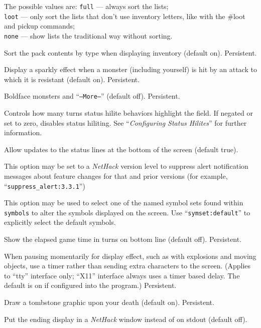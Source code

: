 The possible values are:
{\tt full} --- always sort the lists;\\
{\tt loot} --- only sort the lists that don't use inventory
       letters, like with the \#loot and pickup commands;\\
{\tt none} --- show lists the traditional way without sorting.
\item[\ib{sortpack}]
Sort the pack contents by type when displaying inventory (default on).
Persistent.
\item[\ib{sparkle}]
Display a sparkly effect when a monster (including yourself) is hit by an
attack to which it is resistant (default on).  Persistent.
\item[\ib{standout}]
Boldface monsters and ``{\tt --More--}'' (default off).  Persistent.
\item[\ib{statushilites}]
Controls how many turns status hilite behaviors highlight
the field. If negated or set to zero, disables status hiliting.
See ``{\it Configuring Status Hilites\/}'' for further information.
\item[\ib{status\verb+_+updates}]
Allow updates to the status lines at the bottom of the screen (default true).
\item[\ib{suppress\verb+_+alert}]
This option may be set to a {\it NetHack\/} version level to suppress
alert notification messages about feature changes for that
and prior versions (for example, ``{\tt suppress\verb+_+alert:3.3.1}'')
\item[\ib{symset}]
This option may be used to select one of the named symbol sets found within
{\tt symbols} to alter the symbols displayed on the screen.
Use ``{\tt symset:default}'' to explicitly select the default symbols.
\item[\ib{time}]
Show the elapsed game time in turns on bottom line (default off).  Persistent.
\item[\ib{timed\verb+_+delay}]
When pausing momentarily for display effect, such as with explosions and
moving objects, use a timer rather than sending extra characters to the
screen.  (Applies to ``tty'' interface only; ``X11'' interface always
uses a timer based delay.  The default is on if configured into the
program.)  Persistent.
\item[\ib{tombstone}]
Draw a tombstone graphic upon your death (default on).  Persistent.
\item[\ib{toptenwin}]
Put the ending display in a {\it NetHack\/} window instead of on stdout (default off).
